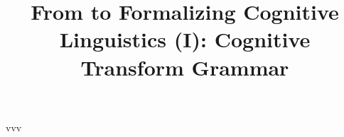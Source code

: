 \documentclass[10pt,twocolumn]{article}
\begin{document}
\title{From  to 
Formalizing Cognitive Linguistics (I): Cognitive Transform Grammar}

vvv
\end{document}
